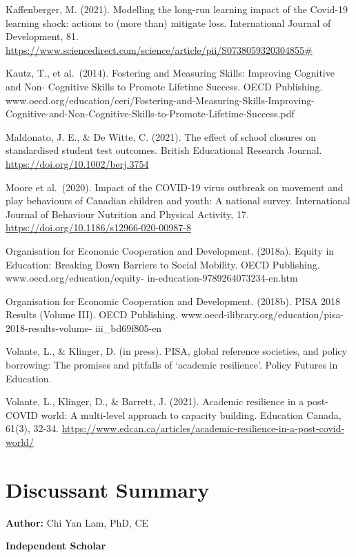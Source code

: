 \documentclass[
]{book}
\begin{document}
Kaffenberger, M. (2021). Modelling the long-run learning impact of the Covid-19 learning shock: actions to (more than) mitigate loss. International Journal of Development, 81. \url{https://www.sciencedirect.com/science/article/pii/S0738059320304855\#}

Kautz, T., et al.~(2014). Fostering and Measuring Skills: Improving Cognitive and Non- Cognitive Skills to Promote Lifetime Success. OECD Publishing. www.oecd.org/education/ceri/Fostering-and-Measuring-Skills-Improving-Cognitive-and-Non-Cognitive-Skills-to-Promote-Lifetime-Success.pdf

Maldonato, J. E., \& De Witte, C. (2021). The effect of school closures on standardised student test outcomes. British Educational Research Journal. \url{https://doi.org/10.1002/berj.3754}

Moore et al.~(2020). Impact of the COVID-19 virus outbreak on movement and play behaviours of Canadian children and youth: A national survey. International Journal of Behaviour Nutrition and Physical Activity, 17. \url{https://doi.org/10.1186/s12966-020-00987-8}

Organisation for Economic Cooperation and Development. (2018a). Equity in Education: Breaking Down Barriers to Social Mobility. OECD Publishing. www.oecd.org/education/equity- in-education-9789264073234-en.htm

Organisation for Economic Cooperation and Development. (2018b). PISA 2018 Results (Volume III). OECD Publishing. www.oecd-ilibrary.org/education/pisa-2018-results-volume- iii\_bd69f805-en

Volante, L., \& Klinger, D. (in press). PISA, global reference societies, and policy borrowing: The promises and pitfalls of `academic resilience'. Policy Futures in Education.

Volante, L., Klinger, D., \& Barrett, J. (2021). Academic resilience in a post-COVID world: A multi-level approach to capacity building. Education Canada, 61(3), 32-34. \url{https://www.edcan.ca/articles/academic-resilience-in-a-post-covid-world/}

\newpage

\hypertarget{discussant-summary}{%
\section{Discussant Summary}\label{discussant-summary}}

\textbf{Author:} Chi Yan Lam, PhD, CE

\textbf{Independent Scholar}
\end{document}
